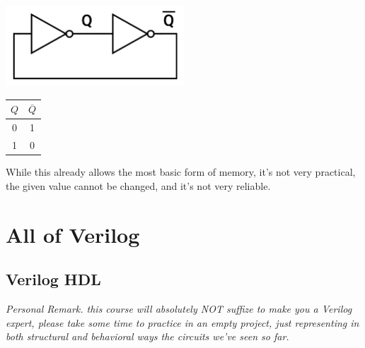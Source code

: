 \documentclass[12pt,openany, tikz,border=10pt]{book}
\begin{document}
\vspace*{10px} 
\begin{minipage}{0.45\textwidth}
	\begin{center}
		\includegraphics[width=0.50\textwidth]{circuits/12.1.3.png}
	\end{center}
\end{minipage}
\hfill
\vline
\hfill
\begin{minipage}{0.45\textwidth}
	\begin{center}
		\large
		\begin{tabular}{|c|c|}
			\hline
			
			$Q$ & $\overline{Q}$ \\
			\hline
			0 & 1 \\
			1 & 0 \\
			\hline
		\end{tabular}
	\end{center}
\end{minipage}
\vspace*{10px}
While this already allows the most basic form of memory, it's not very practical, the given value cannot be changed, and it's not very reliable.
\

\chapter{All of Verilog}
\label{Verilog}\newpage
\section{Verilog HDL}
					\textit{Personal Remark. this course will absolutely NOT suffize to make you a Verilog expert, please take some time to practice in an empty project, just representing in both structural and behavioral ways the circuits we've seen so far. }
\end{document}
